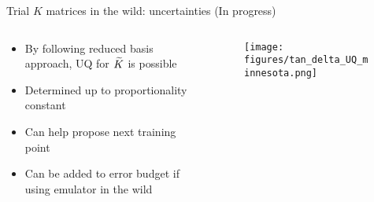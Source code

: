 \documentclass[xcolor=dvipsnames, aspectratio=169]{beamer}
\begin{document}
\begin{frame}{Trial $K$ matrices in the wild: uncertainties (In progress)}
\begin{columns}[t]
\begin{column}{0.5\textwidth}
\begin{itemize}
\item By following reduced basis approach, UQ for $\widetilde{K}$ is possible
\item Determined up to proportionality constant
\item Can help propose next training point
\item Can be added to error budget if using emulator in the wild
\end{itemize}
\end{column}
\begin{column}{0.5\textwidth}
\begin{figure}
\vspace{-0.4cm}
\texttt{[image: figures/tan\_delta\_UQ\_minnesota.png]}
\end{figure}
\end{column}
\end{columns}
\end{frame}
\end{document}
